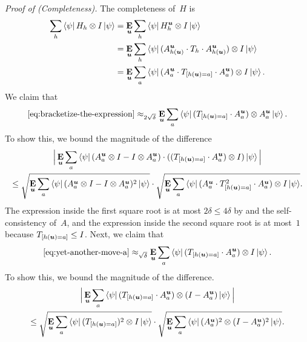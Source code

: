 \vspace{\baselineskip}
\noindent
\emph{Proof of  (Completeness).}
The completeness of~$H$ is
\begin{align}
\sum_h \bra{\psi} H_h \otimes I \ket{\psi}
& = \mathop{\bf E\/}_{\boldsymbol{u}} \sum_h \bra{\psi} H^{\boldsymbol{u}}_h \otimes I \ket{\psi}\nonumber\\
&= \mathop{\bf E\/}_{\boldsymbol{u}} \sum_h \bra{\psi} (A^{\boldsymbol{u}}_{h(\boldsymbol{u})} \cdot T_h \cdot A^{\boldsymbol{u}}_{h(\boldsymbol{u})}) \otimes I \ket{\psi}\nonumber\\
&= \mathop{\bf E\/}_{\boldsymbol{u}} \sum_a \bra{\psi} (A^{\boldsymbol{u}}_{a} \cdot T_{[h(\boldsymbol{u}) = a]} \cdot A^{\boldsymbol{u}}_{a}) \otimes I \ket{\psi}.\label{eq:bracketize-the-expression}
\end{align}
We claim that
\begin{equation}\label{eq:yet-another-move-a}
\eqref{eq:bracketize-the-expression}
\approx_{2\sqrt{\delta}}
\mathop{\bf E\/}_{\boldsymbol{u}} \sum_a \bra{\psi} ( T_{[h(\boldsymbol{u})=a]} \cdot A^{\boldsymbol{u}}_{a}) \otimes A^{\boldsymbol{u}}_{a} \ket{\psi}.
\end{equation}
To show this, we bound the magnitude of the difference
\begin{multline*}
\Big|\mathop{\bf E\/}_{\boldsymbol{u}} \sum_a \bra{\psi} (A^{\boldsymbol{u}}_{a} \otimes I - I \otimes A^{\boldsymbol{u}}_{a}) \cdot (( T_{[h(\boldsymbol{u}) = a]} \cdot A^{\boldsymbol{u}}_{a}) \otimes I) \ket{\psi}\Big|\\
\leq
\sqrt{\mathop{\bf E\/}_{\boldsymbol{u}} \sum_a \bra{\psi} (A^{\boldsymbol{u}}_{a} \otimes I - I \otimes A^{\boldsymbol{u}}_{a})^2 \ket{\psi}}
\cdot \sqrt{\mathop{\bf E\/}_{\boldsymbol{u}} \sum_a \bra{\psi} (A^{\boldsymbol{u}}_{a} \cdot  T^2_{[h(\boldsymbol{u}) = a]} \cdot A^{\boldsymbol{u}}_{a}) \otimes I \ket{\psi}}.
\end{multline*}
The expression inside the first square root is at most $2\delta \leq 4 \delta$
by  and the self-consistency of~$A$,
and the expression inside the second square root is at most~$1$ because $T_{[h(\boldsymbol{u}) = a]} \leq I$.
Next, we claim that 
\begin{equation}\label{eq:mysterious-case-of-the-disappearing-a}
\eqref{eq:yet-another-move-a}
\approx_{\sqrt{\delta}}
\mathop{\bf E\/}_{\boldsymbol{u}} \sum_a \bra{\psi} ( T_{[h(\boldsymbol{u})=a]} \cdot A^{\boldsymbol{u}}_{a}) \otimes I \ket{\psi}.
\end{equation}
To show this, we bound the magnitude of the difference.
\begin{multline*}
\Big|\mathop{\bf E\/}_{\boldsymbol{u}} \sum_a \bra{\psi} ( T_{[h(\boldsymbol{u})=a]} \cdot A^{\boldsymbol{u}}_{a}) \otimes (I-A^{\boldsymbol{u}}_{a}) \ket{\psi}\Big|\\
\leq
\sqrt{\mathop{\bf E\/}_{\boldsymbol{u}} \sum_a \bra{\psi} ( T_{[h(\boldsymbol{u})=a]})^2 \otimes I \ket{\psi}}
\cdot \sqrt{\mathop{\bf E\/}_{\boldsymbol{u}} \sum_a \bra{\psi} ( A^{\boldsymbol{u}}_{a})^2 \otimes (I-A^{\boldsymbol{u}}_{a})^2 \ket{\psi}}.
\end{multline*}

